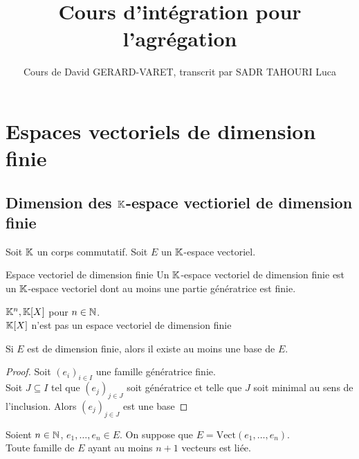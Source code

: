 \documentclass[]{report}
\title{Cours d'intégration pour l'agrégation}
\author{Cours de David GERARD-VARET, transcrit par SADR TAHOURI Luca}
\date{}
\begin{document}
    \maketitle
    \tableofcontents

\chapter{Espaces vectoriels de dimension finie}

\section{Dimension des $\mathbb{K}$-espace vectioriel de dimension finie}

Soit $\mathbb{K}$ un corps commutatif. Soit $E$ un $\mathbb{K}$-espace vectoriel.

\begin{df}{Espace vectoriel de dimension finie}{}
    Un $\mathbb{K}$-espace vectoriel de dimension finie est un $\mathbb{K}$-espace vectoriel dont au moins une partie génératrice est finie.
\end{df}

\begin{ex}{}{}
    $\mathbb{K}^n,\mathbb{K}[X]$ pour $n\in \mathbb{N}$.\\
    $\mathbb{K}[X]$ n'est pas un espace vectoriel de dimension finie
\end{ex}

\begin{tm}{}{}
    Si $E$ est de dimension finie, alors il existe au moins une base de $E$.
\end{tm}

\begin{proof}
    Soit $(e_i)_{i\in I}$ une famille génératrice finie.\\
    Soit $J\subseteq I$ tel que $(e_j)_{j\in J}$ soit génératrice et telle que $J$ soit minimal au sens de l'inclusion. Alors $(e_j)_{j\in J}$ est une base
\end{proof}

\begin{lm}{}{}
    Soient $n\in \mathbb{N}$, $e_1,\ldots,e_n \in E$. On suppose que $E=\text{Vect}(e_1,\ldots,e_n)$.\\
    Toute famille de $E$ ayant au moins $n+1$ vecteurs est liée.
\end{lm}
\end{document}
